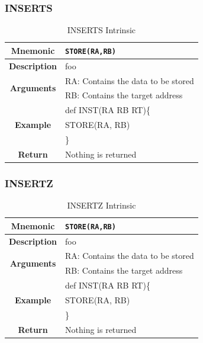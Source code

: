 \documentclass{article}
\begin{document}
\clearpage
\subsubsection{INSERTS}
\label{sec:INSERTS}

\begin{table}[h]
\begin{center}
\caption{INSERTS Intrinsic}
\vspace{0.125in}
\label{tab:INSERTSIntrinsic}
\begin{tabular}{|c|l|}
\hline
\textbf{Mnemonic} & \texttt{STORE(RA,RB)}\\
\hline
\textbf{Description} & foo\\
\hline
\multirow{2}{*}{\textbf{Arguments}} & RA: Contains the data to be stored\\
                          			     & RB: Contains the target address \\
\hline
\multirow{3}{*}{\textbf{Example}} & def INST(RA RB RT)\{\\
                          			  &   STORE(RA, RB)\\
                                                    & \}\\
\hline
\textbf{Return} & Nothing is returned\\                                                    
\hline
\end{tabular}
\end{center}
\end{table}

\clearpage
\subsubsection{INSERTZ}
\label{sec:INSERTZ}

\begin{table}[h]
\begin{center}
\caption{INSERTZ Intrinsic}
\vspace{0.125in}
\label{tab:INSERTZIntrinsic}
\begin{tabular}{|c|l|}
\hline
\textbf{Mnemonic} & \texttt{STORE(RA,RB)}\\
\hline
\textbf{Description} & foo\\
\hline
\multirow{2}{*}{\textbf{Arguments}} & RA: Contains the data to be stored\\
                          			     & RB: Contains the target address \\
\hline
\multirow{3}{*}{\textbf{Example}} & def INST(RA RB RT)\{\\
                          			  &   STORE(RA, RB)\\
                                                    & \}\\
\hline
\textbf{Return} & Nothing is returned\\                                                    
\hline
\end{tabular}
\end{center}
\end{table}
\end{document}

